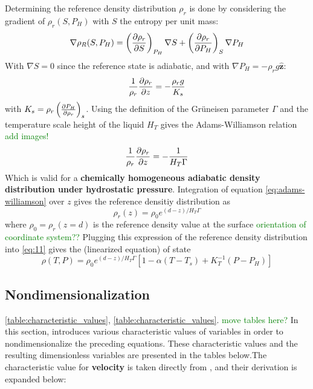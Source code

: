 \documentclass[document.tex]{subfiles}
\begin{document}
Determining the reference density distribution $\rho_r$ is done by considering the gradient of $\rho_r(S, P_H)$ with $S$ 
the entropy per unit mass: 
\begin{equation}
    \nabla\rho_R(S,P_H) = \left(\pdv{\rho_r}{S}\right)_{P_H} \nabla S + \left(\pdv{\rho_r}{P_H}\right)_S\nabla P_H
\end{equation}
With $\nabla S = 0$ since the reference state is adiabatic, and with $\nabla P_H = -\rho_rg \bm{\hat{z}}$:
\begin{equation}
    \frac{1}{\rho_r} \pdv{\rho_r}{z} = -\frac{\rho_r g}{K_s}
\end{equation} 
with $K_s = \rho_r\left(\pdv{P_H}{\rho_r}\right)_s$. Using the definition of the Grüneisen parameter $\Gamma$ and the temperature scale height of the liquid
$H_T$ gives the Adams-Williamson relation \textcolor{green}{add images!}
\begin{equation} \label{eq:adams-williamson}
    \frac{1}{\rho_r} \pdv{\rho_r}{z} = -\frac{1}{H_T \Gamma}
\end{equation}
Which is valid for a \textbf{chemically homogeneous adiabatic density distribution under hydrostatic pressure}. 
Integration of equation \ref{eq:adams-williamson} over $z$ gives the reference densitiy distribution as
\begin{equation} \label{eq:15}
    \rho_r(z)= \rho_0 e^{(d-z)/H_T \Gamma}
\end{equation}
where $\rho_0 = \rho_r(z=d)$ is the reference density value at the surface \textcolor{green}{orientation of coordinate system??}
Plugging this expression of the reference density distribution into \ref{eq:11} gives the (linearized equation) of state
\begin{equation} \label{eq:16}
    \rho(T,P) = \rho_0 e^{(d-z)/H_T \Gamma}[1-\alpha (T-T_s)+K_T^{-1}(P-P_H)]
\end{equation}

\subsection{Nondimensionalization} \label{subsection:nondimensionalization}
\ref{table:characteristic_values}, \ref{table:characteristic_values}. \textcolor{green}{move tables here?}
In this section, \cite{jamc80} introduces various characteristic values of variables in order to nondimensionalize the preceding equations. These characteristic values and the resulting dimensionless 
variables are presented in the tables below.The characteristic value for \textbf{velocity} is taken directly from \cite{mcrw74}, and their derivation is expanded below: 
\end{document}
